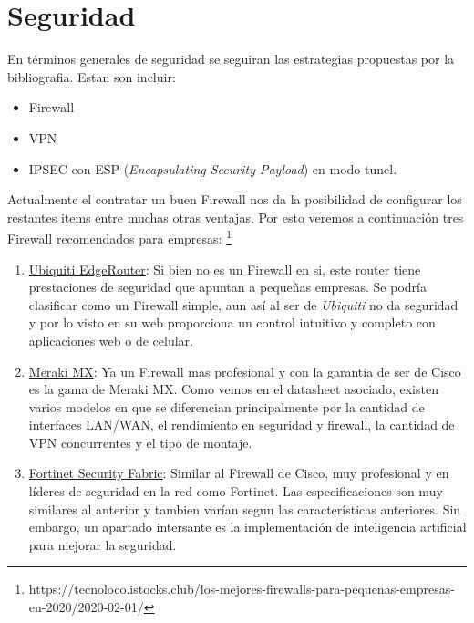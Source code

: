 \documentclass[11pt]{article}
\begin{document}
    \section{Seguridad}
    En términos generales de seguridad se seguiran las estrategias propuestas por la bibliografia. Estan son incluir:
    \begin{itemize}
        \item Firewall
        \item VPN
        \item IPSEC con ESP (\textit{Encapsulating Security Payload}) en modo tunel.
    \end{itemize}

    Actualmente el contratar un buen Firewall nos da la posibilidad de configurar los restantes items entre muchas otras ventajas. Por esto veremos a continuación tres Firewall
    recomendados para empresas: \footnote{https://tecnoloco.istocks.club/los-mejores-firewalls-para-pequenas-empresas-en-2020/2020-02-01/}


    \begin{enumerate}
        \item  \href{https://www.ui.com/edgemax/edgerouter/}{Ubiquiti EdgeRouter}: Si bien no es un Firewall en si, este router tiene prestaciones de seguridad que apuntan a pequeñas
        empresas. Se podría clasificar como un Firewall simple, aun así al ser de \textit{Ubiquiti} no da seguridad y por lo visto en su web proporciona 
        un control intuitivo y completo con aplicaciones web o de celular.
        \item \href{https://meraki.cisco.com/lib/pdf/meraki_datasheet_mx_es.pdf}{Meraki MX}: Ya un Firewall mas profesional y con la garantia de ser de Cisco es la gama de Meraki MX.
        Como vemos en el datasheet asociado, existen varios modelos en que se diferencian principalmente por la cantidad de interfaces LAN/WAN, el rendimiento en seguridad y firewall, la
        cantidad de VPN concurrentes y el tipo de montaje. 
        \item \href{https://www.fortinet.com/content/dam/fortinet/assets/white-papers/wp-security-fabric.pdf}{Fortinet Security Fabric}: Similar al Firewall de Cisco, muy profesional y
        en líderes de seguridad en la red como Fortinet. Las especificaciones son muy similares al anterior y tambien varían segun las características anteriores. Sin embargo, un apartado 
        intersante es la implementación de inteligencia artificial para mejorar la seguridad.
    \end{enumerate}
\end{document}
